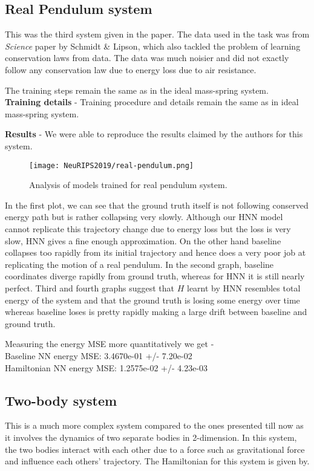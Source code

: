 \documentclass{article}
\begin{document}
\subsection{Real Pendulum system}
This was the third system given in the paper. The data used in the task was from \textit{Science} paper by Schmidt & Lipson, which also tackled the problem of learning conservation laws from data. The data was much noisier and did not exactly follow any conservation law due to energy loss due to air resistance.

The training steps remain the same as in the ideal mass-spring system.\\
\textbf{Training details} - Training procedure and details remain the same as in ideal mass-spring system.

\textbf{Results} - We were able to reproduce the results claimed by the authors for this system.
\begin{figure}[htp]
    \centering
    \texttt{[image: NeuRIPS2019/real-pendulum.png]}
    \caption{Analysis of models trained for real pendulum system.}
    \label{fig:galaxy}
\end{figure}

In the first plot, we can see that the ground truth itself is not following conserved energy path but is rather collapsing very slowly. Although our HNN model cannot replicate this trajectory change due to energy loss but the loss is very slow, HNN gives a fine enough approximation. On the other hand baseline collapses too rapidly from its initial trajectory and hence does a very poor job at replicating the motion of a real pendulum. In the second graph, baseline coordinates diverge rapidly from ground truth, whereas for HNN it is still nearly perfect. Third and fourth graphs suggest that \(H\) learnt by HNN resembles total energy of the system and that the ground truth is losing some energy over time whereas baseline loses is pretty rapidly making a large drift between baseline and ground truth.

Measuring the energy MSE more quantitatively we get -\\
Baseline NN energy MSE: 3.4670e-01 +/- 7.20e-02\\
Hamiltonian NN energy MSE: 1.2575e-02 +/- 4.23e-03

\subsection{Two-body system}
This is a much more complex system compared to the ones presented till now as it involves the dynamics of two separate bodies in 2-dimension. In this system, the two bodies interact with each other due to a force such as gravitational force and influence each others' trajectory. The Hamiltonian for this system is given by.
\end{document}
